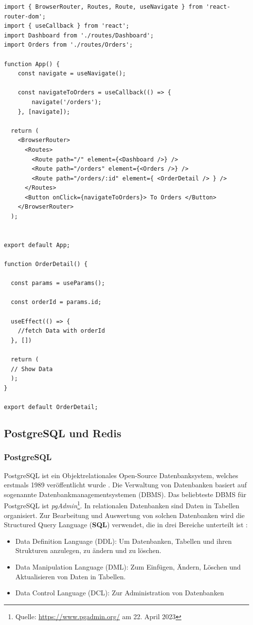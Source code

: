 \documentclass[a4paper,12pt]{report}
\begin{document}
\begin{lstlisting}[style=codeStyle, caption={Beispiel von verschiedenen Komponenten auf verschiedenen Pfaden \\
Quelle: \cite{react-key-concepts} (abgewandelt)}, label={lst:react-router-example}]
import { BrowserRouter, Routes, Route, useNavigate } from 'react-router-dom';
import { useCallback } from 'react';
import Dashboard from './routes/Dashboard';
import Orders from './routes/Orders';

function App() {
	const navigate = useNavigate();
	
	const navigateToOrders = useCallback(() => {
		navigate('/orders');
	}, [navigate]);

  return (
    <BrowserRouter>
      <Routes>
        <Route path="/" element={<Dashboard />} />
        <Route path="/orders" element={<Orders />} />
        <Route path="/orders/:id" element={ <OrderDetail /> } />
      </Routes>
      <Button onClick={navigateToOrders}> To Orders </Button>
    </BrowserRouter>
  );


export default App;

function OrderDetail() {

  const params = useParams();

  const orderId = params.id; 
  
  useEffect(() => {
	//fetch Data with orderId  
  }, [])

  return (
  // Show Data
  );
}

export default OrderDetail;
\end{lstlisting}
        \subsection{PostgreSQL und Redis}
        \subsubsection{PostgreSQL}
        \label{sec:PostgreSQL}
PostgreSQL ist ein Objektrelationales Open-Source Datenbanksystem, welches erstmals 1989 veröffentlicht wurde \cite{postgresql-book}. Die Verwaltung von Datenbanken basiert auf sogenannte Datenbankmanagementsystemen (DBMS). Das beliebteste DBMS für PostgreSQL ist \textit{pgAdmin}\footnote{Quelle: \url{https://www.pgadmin.org/} am 22. April 2023}.  In relationalen Datenbanken sind Daten in Tabellen organisiert. Zur Bearbeitung und Auswertung von solchen Datenbanken wird die Structured Query Language (\textbf{SQL}) verwendet, die in drei Bereiche unterteilt ist \cite{sql-book}:
\begin{itemize}
 \item Data Definition Language (DDL): Um Datenbanken, Tabellen und ihren Strukturen anzulegen, zu ändern und zu löschen.
 \item  Data Manipulation Language (DML): Zum Einfügen, Ändern, Löschen und Aktualisieren von Daten in Tabellen.
 \item Data Control Language (DCL): Zur Administration von Datenbanken
\end{itemize}
\end{document}
